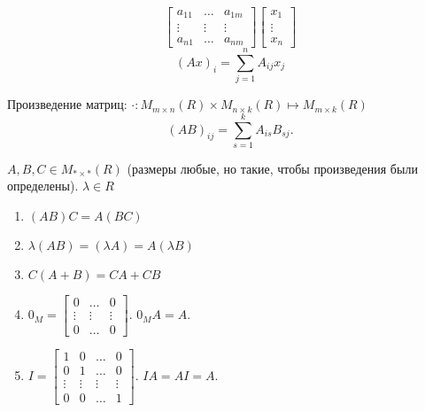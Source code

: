 \begin{definition} \thmslashn 

\begin{equation*}
    \begin{bmatrix} 
        a_{11} & \ldots & a_{1m}\\
        \vdots & \vdots & \vdots\\
        a_{n1} & \ldots & a_{nm}
    \end{bmatrix} 
    \begin{bmatrix} x_1\\ \vdots\\ x_{n} \end{bmatrix}
\end{equation*}
\begin{equation*}
    (Ax)_{i} = \sum\limits_{j=1}^{n} A_{ij}x_{j}
\end{equation*}
\end{definition}
\begin{definition} \thmslashn

    Произведение матриц: $\cdot : M_{m \times n}(R) \times M_{n \times k}(R) \mapsto M_{m \times k}(R)$
    \[ (AB)_{ij} = \sum\limits_{s=1}^{k} A_{is}B_{sj} .\] 
\end{definition}
\begin{properties} \thmslashn

    $A, B, C\in M_{* \times *}(R)$ (размеры любые, но такие, чтобы произведения были определены). $\lambda\in R$
    \begin{enumerate}
        \item $(AB)C = A(BC)$
        \item  $\lambda (AB) = (\lambda A) = A(\lambda B)$
        \item $C(A+B) = CA + CB$
        \item  $0_{M} = \begin{bmatrix} 0 & \ldots & 0\\ \vdots & \vdots & \vdots\\ 0 & \ldots & 0 \end{bmatrix} $. $0_{M}A = A$.
        \item $I = \begin{bmatrix} 1 & 0 & \ldots & 0\\ 0 & 1 & \ldots & 0\\ \vdots & \vdots & \vdots & \vdots\\ 0 & 0 & \ldots & 1 \end{bmatrix} $. $IA = AI = A$.
    \end{enumerate}
\end{properties}
